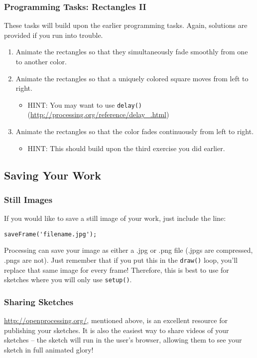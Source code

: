 \subsubsection{Programming Tasks: Rectangles II}
These tasks will build upon the earlier programming tasks.  Again, solutions are provided if you run into trouble.
\begin{enumerate}
\item Animate the rectangles so that they simultaneously fade smoothly from one to another color.
\item Animate the rectangles so that a uniquely colored square moves from left to right.
\begin{itemize}
\item HINT: You may want to use \texttt{delay()} (\url{http://processing.org/reference/delay_.html})
\end{itemize}
\item Animate the rectangles so that the color fades continuously from left to right.
\begin{itemize}
\item HINT: This should build upon the third exercise you did earlier.
\end{itemize}
\end{enumerate}

\subsection{Saving Your Work}
\subsubsection{Still Images}
If you would like to save a still image of your work, just include the line:

\begin{verbatim}
saveFrame('filename.jpg');
\end{verbatim}

Processing can save your image as either a .jpg or .png file (.jpgs are compressed, .pngs are not).  Just remember that if you put this in the \texttt{draw()} loop, you'll replace that same image for every frame!  Therefore, this is best to use for sketches where you will only use \texttt{setup()}.

\subsubsection{Sharing Sketches}
\url{http://openprocessing.org/}, mentioned above, is an excellent resource for publishing your sketches.  It is also the easiest way to share videos of your sketches -- the sketch will run in the user's browser, allowing them to see your sketch in full animated glory!

